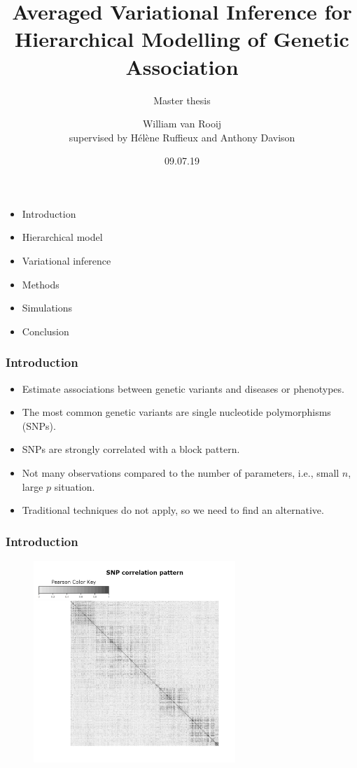 \documentclass{beamer}
\begin{document}
\SetEndCharOfAlgoLine{}

\title{Averaged Variational Inference for Hierarchical Modelling of Genetic Association}
\subtitle{Master thesis}
\author{William van Rooij\\
{\small supervised by Hélène Ruffieux and Anthony Davison}}
\date{09.07.19}
\maketitle
\begin{frame}
\begin{itemize}
\item Introduction
\item Hierarchical model
\item Variational inference
\item Methods
\item Simulations
\item Conclusion
\end{itemize}
\end{frame}

\begin{frame}
\frametitle{Introduction}
\begin{itemize}
\item Estimate associations between genetic variants and diseases or phenotypes.
\item The most common genetic variants are single nucleotide polymorphisms (SNPs).
\item SNPs are strongly correlated with a block pattern.
\item Not many observations compared to the number of parameters, i.e., small $n$, large $p$ situation.
\item Traditional techniques do not apply, so we need to find an alternative.
\end{itemize}
\end{frame}

\begin{frame}
\frametitle{Introduction}
\begin{figure}
\includegraphics[width=3in]{images/corrRealSNPs.pdf}
\end{figure}
\end{frame}
\end{document}
